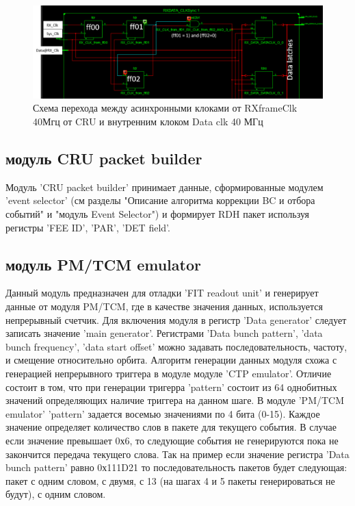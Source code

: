 \documentclass{article}
\begin{document}
\begin{figure}[H]
	\centering 
	\includegraphics[width=1\textwidth]{cross_clock_domain_latch.png}
	\caption{\label{fig:5} Схема перехода между асинхронными клоками от RXframeClk 40Мгц от CRU и внутренним клоком Data clk 40 МГц}
\end{figure}



\subsection{модуль CRU packet builder}
Модуль 'CRU packet builder' принимает данные, сформированные модулем 'event selector' (см разделы "Описание алгоритма коррекции BC и отбора событий" и "модуль Event Selector") и формирует RDH пакет используя регистры 'FEE ID', 'PAR', 'DET field'.




\subsection{модуль PM/TCM emulator}
Данный модуль предназначен для отладки 'FIT readout unit' и генерирует данные от модуля PM/TCM, где в качестве значения данных, используется непрерывный счетчик. Для включения модуля в регистр 'Data generator' следует записать значение 'main generator'. Регистрами 'Data bunch pattern', 'data bunch frequency', 'data start offset' можно задавать последовательность, частоту, и смещение относительно орбита. Алгоритм генерации данных модуля схожа с генерацией непрерывного триггера в модуле модуле 'CTP emulator'. Отличие состоит в том, что при генерации тригерра 'pattern' состоит из 64 однобитных значений определяющих наличие триггера на данном шаге. В модуле 'PM/TCM emulator' 'pattern' задается восемью значениями по 4 бита (0-15). Каждое значение определяет количество слов в пакете для текущего события. В случае если значение превышает 0х6, то следующие события не генерируются пока не закончится передача текущего слова. Так на пример если значение регистра 'Data bunch pattern' равно 0х111D21 то последовательность пакетов будет следующая: пакет с одним словом, с двумя, с 13 (на шагах 4 и 5 пакеты генерироваться не будут), с одним словом.
\end{document}
